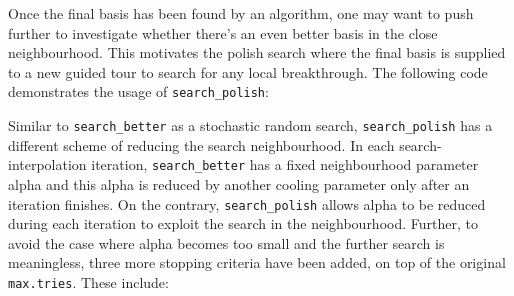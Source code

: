 \documentclass[12pt]{article}
\newenvironment{Shaded}{\begin{snugshade}}{\end{snugshade}}
\newcommand{\DataTypeTok}[1]{\textcolor[rgb]{0.13,0.29,0.53}{#1}}
\newcommand{\DecValTok}[1]{\textcolor[rgb]{0.00,0.00,0.81}{#1}}
\newcommand{\KeywordTok}[1]{\textcolor[rgb]{0.13,0.29,0.53}{\textbf{#1}}}
\newcommand{\NormalTok}[1]{#1}
\newcommand{\OperatorTok}[1]{\textcolor[rgb]{0.81,0.36,0.00}{\textbf{#1}}}
\newcommand{\OtherTok}[1]{\textcolor[rgb]{0.56,0.35,0.01}{#1}}
\newcommand{\StringTok}[1]{\textcolor[rgb]{0.31,0.60,0.02}{#1}}
\begin{document}
Once the final basis has been found by an algorithm, one may want to push further to investigate whether there's an even better basis in the close neighbourhood. This motivates the polish search where the final basis is supplied to a new guided tour to search for any local breakthrough. The following code demonstrates the usage of \texttt{search\_polish}:

\begin{Shaded}
\end{Shaded}

Similar to \texttt{search\_better} as a stochastic random search, \texttt{search\_polish} has a different scheme of reducing the search neighbourhood. In each search-interpolation iteration, \texttt{search\_better} has a fixed neighbourhood parameter alpha and this alpha is reduced by another cooling parameter only after an iteration finishes. On the contrary, \texttt{search\_polish} allows alpha to be reduced during each iteration to exploit the search in the neighbourhood. Further, to avoid the case where alpha becomes too small and the further search is meaningless, three more stopping criteria have been added, on top of the original \texttt{max.tries}. These include:
\end{document}
